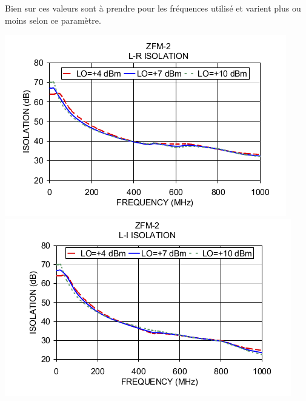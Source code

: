 \documentclass[a4paper,12pt]{report}            %
\begin{document}
    Bien sur ces valeurs sont à prendre pour les fréquences utilisé et varient plus ou moins
selon ce paramètre. \\
\begin{center}
\includegraphics[scale = 0.45]{pic/isolation1_datasheet.png}
\includegraphics[scale = 0.45]{pic/isolation2_datasheet.png}
\end{center}
\end{document}
